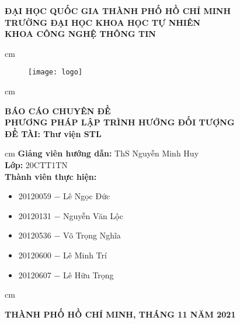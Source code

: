 \begin{titlepage}
\begin{mybox}
\begin{center}
\fontsize{12}{12}\selectfont
\textbf{ĐẠI HỌC QUỐC GIA THÀNH PHỐ HỒ CHÍ MINH}\\
\textbf{TRƯỜNG ĐẠI HỌC KHOA HỌC TỰ NHIÊN}\\
\textbf{KHOA CÔNG NGHỆ THÔNG TIN}
\end{center}
 cm
\begin{figure}[H]
\begin{center}
\texttt{[image: logo]}
\end{center}
\end{figure}
 cm
\begin{center}
\fontsize{18}{14}\selectfont
\textbf{BÁO CÁO CHUYÊN ĐỀ}\\
\fontsize{26}{16}\selectfont
\textbf{PHƯƠNG PHÁP LẬP TRÌNH HƯỚNG ĐỐI TƯỢNG}\\
\fontsize{18}{12}\selectfont
\textbf{ĐỀ TÀI: Thư viện STL}
\end{center}
 cm
\fontsize{14}{12}\selectfont
\textbf{Giảng viên hướng dẫn:} ThS Nguyễn Minh Huy\\
\textbf{Lớp:} 20CTT1TN\\
\textbf{Thành viên thực hiện:}
\begin{itemize}
\item 20120059 $-$ Lê Ngọc Đức
\item 20120131 $-$ Nguyễn Văn Lộc
\item 20120536 $-$ Võ Trọng Nghĩa
\item 20120600 $-$ Lê Minh Trí
\item 20120607 $-$ Lê Hữu Trọng
\end{itemize}
 cm
\begin{center}
\textbf{THÀNH PHỐ HỒ CHÍ MINH, THÁNG 11 NĂM 2021}
\end{center}
\end{mybox}
\end{titlepage}
